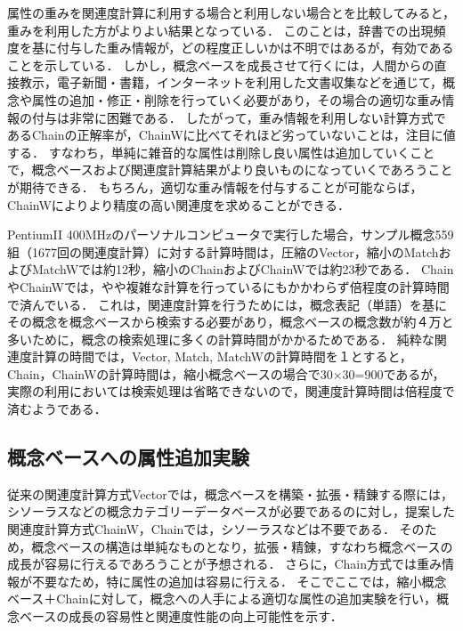 属性の重みを関連度計算に利用する場合と利用しない場合とを比較してみると，重みを利用した方がよりよい結果となっている．
このことは，辞書での出現頻度を基に付与した重み情報が，どの程度正しいかは不明ではあるが，有効であることを示している．
しかし，概念ベースを成長させて行くには，人間からの直接教示，電子新聞・書籍，インターネットを利用した文書収集などを通じて，概念や属性の追加・修正・削除を行っていく必要があり，その場合の適切な重み情報の付与は非常に困難である．
したがって，重み情報を利用しない計算方式であるChainの正解率が，ChainWに比べてそれほど劣っていないことは，注目に値する．
すなわち，単純に雑音的な属性は削除し良い属性は追加していくことで，概念ベースおよび関連度計算結果がより良いものになっていくであろうことが期待できる．
もちろん，適切な重み情報を付与することが可能ならば，ChainWによりより精度の高い関連度を求めることができる．

PentiumII 400MHzのパーソナルコンピュータで実行した場合，サンプル概念559組（1677回の関連度計算）に対する計算時間は，圧縮のVector，縮小のMatchおよびMatchWでは約12秒，縮小のChainおよびChainWでは約23秒である．
ChainやChainWでは，やや複雑な計算を行っているにもかかわらず倍程度の計算時間で済んでいる．
これは，関連度計算を行うためには，概念表記（単語）を基にその概念を概念ベースから検索する必要があり，概念ベースの概念数が約４万と多いために，概念の検索処理に多くの計算時間がかかるためである．
純粋な関連度計算の時間では，Vector, Match, MatchWの計算時間を１とすると，Chain，ChainWの計算時間は，縮小概念ベースの場合で30×30=900であるが，実際の利用においては検索処理は省略できないので，関連度計算時間は倍程度で済むようである．


\subsection{概念ベースへの属性追加実験}

従来の関連度計算方式Vectorでは，概念ベースを構築・拡張・精錬する際には，シソーラスなどの概念カテゴリーデータベースが必要であるのに対し，提案した関連度計算方式ChainW，Chainでは，シソーラスなどは不要である．
そのため，概念ベースの構造は単純なものとなり，拡張・精錬，すなわち概念ベースの成長が容易に行えるであろうことが予想される．
さらに，Chain方式では重み情報が不要なため，特に属性の追加は容易に行える．
そこでここでは，縮小概念ベース＋Chainに対して，概念への人手による適切な属性の追加実験を行い，概念ベースの成長の容易性と関連度性能の向上可能性を示す．

